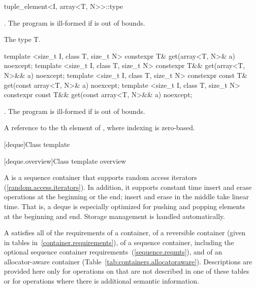 %
\begin{itemdecl}
tuple_element<I, array<T, N>>::type
\end{itemdecl}

\begin{itemdescr}
\pnum
\requires {}. The program is ill-formed if  is out of bounds.

\pnum
\cvalue  The type T.
\end{itemdescr}

%
\begin{itemdecl}
template <size_t I, class T, size_t N>
  constexpr T& get(array<T, N>& a) noexcept;
template <size_t I, class T, size_t N>
  constexpr T&& get(array<T, N>&& a) noexcept;
template <size_t I, class T, size_t N>
  constexpr const T& get(const array<T, N>& a) noexcept;
template <size_t I, class T, size_t N>
  constexpr const T&& get(const array<T, N>&& a) noexcept;
\end{itemdecl}

\begin{itemdescr}
\pnum
\requires {}. The program is ill-formed if  is out of bounds.

\pnum
\returns A reference to the th element of ,
where indexing is zero-based.
\end{itemdescr}

[deque]{Class template }

[deque.overview]{Class template  overview}

\pnum
A
%
is a sequence container that supports random access iterators (\ref{random.access.iterators}).
In addition, it supports constant time insert and erase operations at the beginning or the end;
insert and erase in the middle take linear time.
That is, a deque is especially optimized for pushing and popping elements at the beginning and end.
Storage management is handled automatically.

\pnum
A
satisfies all of the requirements of a container, of a reversible container
(given in tables in~\ref{container.requirements}), of a sequence container,
including the optional sequence container requirements~(\ref{sequence.reqmts}), and of an allocator-aware container (Table~\ref{tab:containers.allocatoraware}).
Descriptions are provided here only for operations on
that are not described in one of these tables
or for operations where there is additional semantic information.

